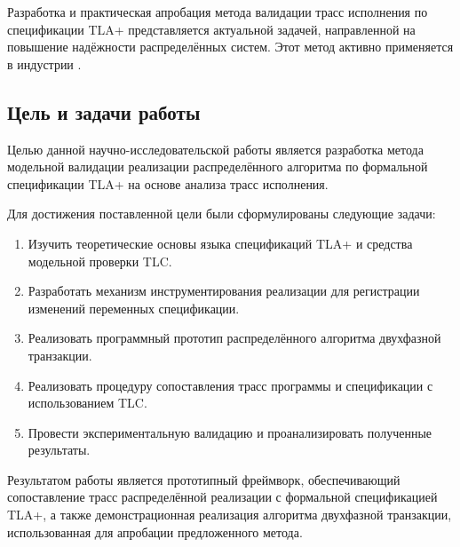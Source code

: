 Разработка и практическая апробация метода валидации трасс исполнения по
спецификации TLA+ представляется актуальной задачей, направленной на повышение
надёжности распределённых систем. Этот метод активно применяется в индустрии
\cite{newcombe2015aws}.

\subsection*{Цель и задачи работы}

Целью данной научно-исследовательской работы является разработка метода
модельной валидации реализации распределённого алгоритма по формальной
спецификации TLA+ на основе анализа трасс исполнения.

Для достижения поставленной цели были сформулированы следующие задачи:

\begin{enumerate}
    \item Изучить теоретические основы языка спецификаций TLA+ и средства
модельной проверки TLC.
    \item Разработать механизм инструментирования реализации для регистрации
изменений переменных спецификации.
    \item Реализовать программный прототип распределённого алгоритма двухфазной
транзакции.
    \item Реализовать процедуру сопоставления трасс программы и спецификации
с использованием TLC.
    \item Провести экспериментальную валидацию и проанализировать полученные
результаты.
\end{enumerate}

Результатом работы является прототипный фреймворк, обеспечивающий сопоставление
трасс распределённой реализации с формальной спецификацией TLA+, а также
демонстрационная реализация алгоритма двухфазной транзакции, использованная для
апробации предложенного метода.
